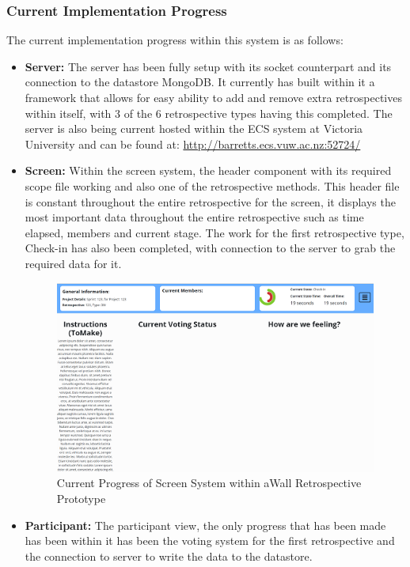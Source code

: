 \subsubsection{Current Implementation Progress}
The current implementation progress within this system is as follows:
\begin{itemize}
\item \textbf{Server:} The server has been fully setup with its socket counterpart and its connection to the datastore MongoDB. It currently has built within it a framework that allows for easy ability to add and remove extra retrospectives within itself, with 3 of the 6 retrospective types having this completed. The server is also being current hosted within the ECS system at Victoria University and can be found at: \url{http://barretts.ecs.vuw.ac.nz:52724/}
\item \textbf{Screen:} Within the screen system, the header component with its required scope file working and also one of the retrospective methods. This header file is constant throughout the entire retrospective for the screen, it displays the most important data throughout the entire retrospective such as time elapsed, members and current stage. The work for the first retrospective type, Check-in has also been completed, with connection to the server to grab the required data for it. 
\begin{figure}[ht]
\centering
\includegraphics{moderator_progress}
\caption{Current Progress of Screen System within aWall Retrospective Prototype}
\end{figure}
\item \textbf{Participant:} The participant view, the only progress that has been made has been within it has been the voting system for the first retrospective and the connection to server to write the data to the datastore.

\end{itemize}

